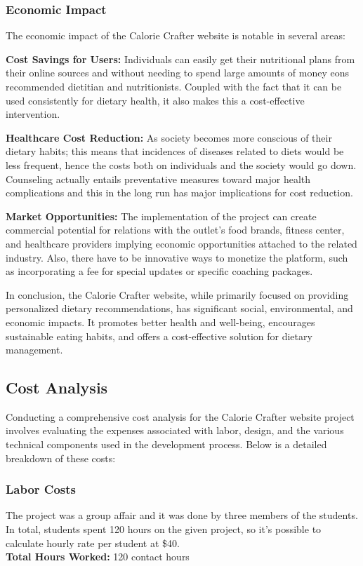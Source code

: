 \documentclass[a4paper,12pt]{article}
\begin{document}
\subsubsection{Economic Impact}
The economic impact of the Calorie Crafter website is notable in several areas:

\noindent\textbf{Cost Savings for Users:} Individuals can easily get their nutritional plans from their online sources and without needing to spend large amounts of money eons recommended dietitian and nutritionists. Coupled with the fact that it can be used consistently for dietary health, it also makes this a cost-effective intervention.

\noindent\textbf{Healthcare Cost Reduction:} As society becomes more conscious of their dietary habits; this means that incidences of diseases related to diets would be less frequent, hence the costs both on individuals and the society would go down. Counseling actually entails preventative measures toward major health complications and this in the long run has major implications for cost reduction.

\noindent\textbf{Market Opportunities:} The implementation of the project can create commercial potential for relations with the outlet’s food brands, fitness center, and healthcare providers implying economic opportunities attached to the related industry. Also, there have to be innovative ways to monetize the platform, such as incorporating a fee for special updates or specific coaching packages.

In conclusion, the Calorie Crafter website, while primarily focused on providing personalized dietary recommendations, has significant social, environmental, and economic impacts. It promotes better health and well-being, encourages sustainable eating habits, and offers a cost-effective solution for dietary management.


\subsection{Cost Analysis}
Conducting a comprehensive cost analysis for the Calorie Crafter website project involves evaluating the expenses associated with labor, design, and the various technical components used in the development process. Below is a detailed breakdown of these costs:

\subsubsection{Labor Costs}
The project was a group affair and it was done by three members of the students. In total, students spent 120 hours on the given project, so it’s possible to calculate hourly rate per student at \$40.
\\ \noindent\textbf{Total Hours Worked:} 120 contact hours
\end{document}
